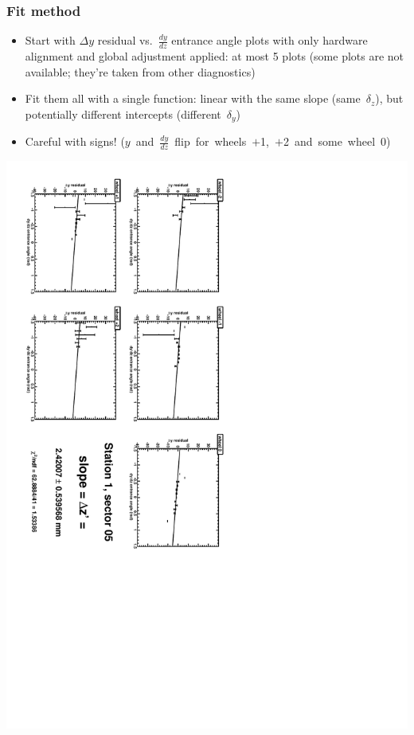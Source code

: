 \documentclass[compress]{beamer}
\begin{document}
\begin{frame}
\frametitle{Fit method}
\begin{itemize}
\item Start with $\Delta y$ residual vs.~$\frac{dy}{dz}$ entrance
  angle plots with only hardware alignment and global adjustment
  applied: at most 5 plots (some plots are not available; they're taken from other diagnostics)
\item Fit them all with a single function: linear with the same slope
  (same~$\delta_z$), but potentially different intercepts (different~$\delta_y$)
\item Careful with signs! \mbox{($y$ and $\frac{dy}{dz}$ flip for wheels $+$1, $+$2 and some wheel~0)\hspace{-2 cm}}
\end{itemize}

\vfill \centering
\includegraphics[height=0.9\linewidth, angle=90]{zfits/zfit_1_05.pdf}
\end{frame}
\end{document}
